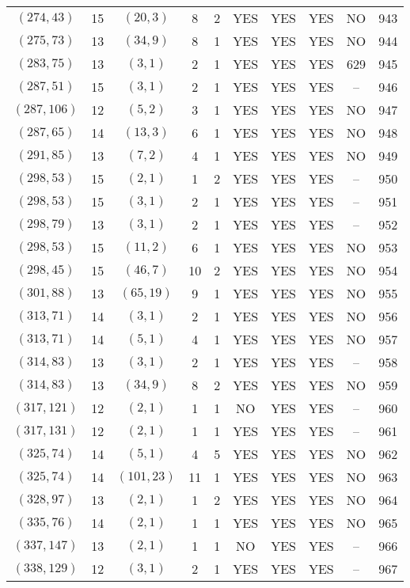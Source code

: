 \begin{longtable}{|c|c|c|c|c|c|c|c|c|c|}
$(274, 43)$ & 15 & $(20, 3)$ & 8 & 2 & YES & YES & YES & NO & 943\\
$(275, 73)$ & 13 & $(34, 9)$ & 8 & 1 & YES & YES & YES & NO & 944\\
$(283, 75)$ & 13 & $(3, 1)$ & 2 & 1 & YES & YES & YES & 629 & 945\\
$(287, 51)$ & 15 & $(3, 1)$ & 2 & 1 & YES & YES & YES & -- & 946\\
$(287, 106)$ & 12 & $(5, 2)$ & 3 & 1 & YES & YES & YES & NO & 947\\
$(287, 65)$ & 14 & $(13, 3)$ & 6 & 1 & YES & YES & YES & NO & 948\\
$(291, 85)$ & 13 & $(7, 2)$ & 4 & 1 & YES & YES & YES & NO & 949\\
$(298, 53)$ & 15 & $(2, 1)$ & 1 & 2 & YES & YES & YES & -- & 950\\
$(298, 53)$ & 15 & $(3, 1)$ & 2 & 1 & YES & YES & YES & -- & 951\\
$(298, 79)$ & 13 & $(3, 1)$ & 2 & 1 & YES & YES & YES & -- & 952\\
$(298, 53)$ & 15 & $(11, 2)$ & 6 & 1 & YES & YES & YES & NO & 953\\
$(298, 45)$ & 15 & $(46, 7)$ & 10 & 2 & YES & YES & YES & NO & 954\\
$(301, 88)$ & 13 & $(65, 19)$ & 9 & 1 & YES & YES & YES & NO & 955\\
$(313, 71)$ & 14 & $(3, 1)$ & 2 & 1 & YES & YES & YES & NO & 956\\
$(313, 71)$ & 14 & $(5, 1)$ & 4 & 1 & YES & YES & YES & NO & 957\\
$(314, 83)$ & 13 & $(3, 1)$ & 2 & 1 & YES & YES & YES & -- & 958\\
$(314, 83)$ & 13 & $(34, 9)$ & 8 & 2 & YES & YES & YES & NO & 959\\
$(317, 121)$ & 12 & $(2, 1)$ & 1 & 1 & NO & YES & YES & -- & 960\\
$(317, 131)$ & 12 & $(2, 1)$ & 1 & 1 & YES & YES & YES & -- & 961\\
$(325, 74)$ & 14 & $(5, 1)$ & 4 & 5 & YES & YES & YES & NO & 962\\
$(325, 74)$ & 14 & $(101, 23)$ & 11 & 1 & YES & YES & YES & NO & 963\\
$(328, 97)$ & 13 & $(2, 1)$ & 1 & 2 & YES & YES & YES & NO & 964\\
$(335, 76)$ & 14 & $(2, 1)$ & 1 & 1 & YES & YES & YES & NO & 965\\
$(337, 147)$ & 13 & $(2, 1)$ & 1 & 1 & NO & YES & YES & -- & 966\\
$(338, 129)$ & 12 & $(3, 1)$ & 2 & 1 & YES & YES & YES & -- & 967\\

\end{longtable}
